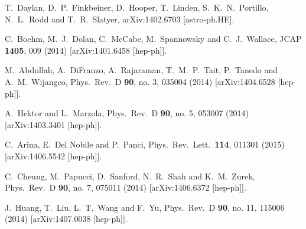 \documentclass[preprintnumbers,superscriptaddress,nofootinbib,aps,prd,floatfix]{revtex4}
\begin{document}
\begin{thebibliography}{99}
  T.~Daylan, D.~P.~Finkbeiner, D.~Hooper, T.~Linden, S.~K.~N.~Portillo, N.~L.~Rodd and T.~R.~Slatyer,
  arXiv:1402.6703 [astro-ph.HE].

  C.~Boehm, M.~J.~Dolan, C.~McCabe, M.~Spannowsky and C.~J.~Wallace,
  JCAP {\bf 1405}, 009 (2014)
  [arXiv:1401.6458 [hep-ph]].

  M.~Abdullah, A.~DiFranzo, A.~Rajaraman, T.~M.~P.~Tait, P.~Tanedo and A.~M.~Wijangco,
  Phys.\ Rev.\ D {\bf 90}, no. 3, 035004 (2014)
  [arXiv:1404.6528 [hep-ph]].

  A.~Hektor and L.~Marzola,
  Phys.\ Rev.\ D {\bf 90}, no. 5, 053007 (2014)
  [arXiv:1403.3401 [hep-ph]].
   
  C.~Arina, E.~Del Nobile and P.~Panci,
  Phys.\ Rev.\ Lett.\  {\bf 114}, 011301 (2015)
  [arXiv:1406.5542 [hep-ph]].

  C.~Cheung, M.~Papucci, D.~Sanford, N.~R.~Shah and K.~M.~Zurek,
  Phys.\ Rev.\ D {\bf 90}, no. 7, 075011 (2014)
  [arXiv:1406.6372 [hep-ph]].

  J.~Huang, T.~Liu, L.~T.~Wang and F.~Yu,
  Phys.\ Rev.\ D {\bf 90}, no. 11, 115006 (2014)
  [arXiv:1407.0038 [hep-ph]].


\end{thebibliography}
\end{document}
